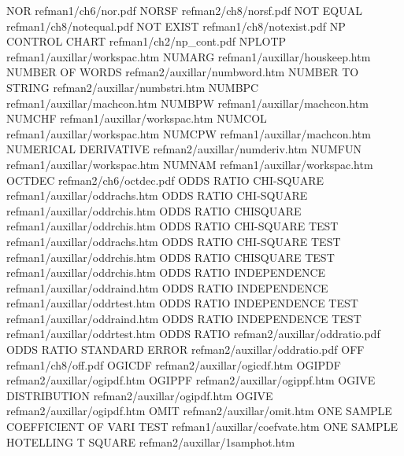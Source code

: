 NOR                                     refman1/ch6/nor.pdf
NORSF                                   refman2/ch8/norsf.pdf
NOT EQUAL                               refman1/ch8/notequal.pdf
NOT EXIST                               refman1/ch8/notexist.pdf
NP CONTROL CHART                        refman1/ch2/np_cont.pdf
NPLOTP                                  refman1/auxillar/workspac.htm
NUMARG                                  refman1/auxillar/houskeep.htm
NUMBER OF WORDS                         refman2/auxillar/numbword.htm
NUMBER TO STRING                        refman2/auxillar/numbstri.htm
NUMBPC                                  refman1/auxillar/machcon.htm
NUMBPW                                  refman1/auxillar/machcon.htm
NUMCHF                                  refman1/auxillar/workspac.htm
NUMCOL                                  refman1/auxillar/workspac.htm
NUMCPW                                  refman1/auxillar/machcon.htm
NUMERICAL DERIVATIVE                    refman2/auxillar/numderiv.htm
NUMFUN                                  refman1/auxillar/workspac.htm
NUMNAM                                  refman1/auxillar/workspac.htm
OCTDEC                                  refman2/ch6/octdec.pdf
ODDS RATIO CHI-SQUARE                   refman1/auxillar/oddrachs.htm
ODDS RATIO CHI-SQUARE                   refman1/auxillar/oddrchis.htm
ODDS RATIO CHISQUARE                    refman1/auxillar/oddrchis.htm
ODDS RATIO CHI-SQUARE TEST              refman1/auxillar/oddrachs.htm
ODDS RATIO CHI-SQUARE TEST              refman1/auxillar/oddrchis.htm
ODDS RATIO CHISQUARE TEST               refman1/auxillar/oddrchis.htm
ODDS RATIO INDEPENDENCE                 refman1/auxillar/oddraind.htm
ODDS RATIO INDEPENDENCE                 refman1/auxillar/oddrtest.htm
ODDS RATIO INDEPENDENCE TEST            refman1/auxillar/oddraind.htm
ODDS RATIO INDEPENDENCE TEST            refman1/auxillar/oddrtest.htm
ODDS RATIO                              refman2/auxillar/oddratio.pdf
ODDS RATIO STANDARD ERROR               refman2/auxillar/oddratio.pdf
OFF                                     refman1/ch8/off.pdf
OGICDF                                  refman2/auxillar/ogicdf.htm
OGIPDF                                  refman2/auxillar/ogipdf.htm
OGIPPF                                  refman2/auxillar/ogippf.htm
OGIVE DISTRIBUTION                      refman2/auxillar/ogipdf.htm
OGIVE                                   refman2/auxillar/ogipdf.htm
OMIT                                    refman2/auxillar/omit.htm
ONE SAMPLE COEFFICIENT OF VARI TEST     refman1/auxillar/coefvate.htm
ONE SAMPLE HOTELLING T SQUARE           refman2/auxillar/1samphot.htm
